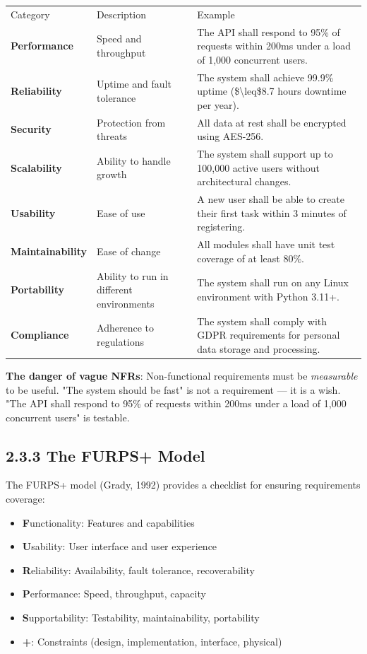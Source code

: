 \documentclass[11pt,a4paper]{book}
\begin{document}
\begin{tabular}{lll}
\hline
Category & Description & Example \\
\textbf{Performance} & Speed and throughput & The API shall respond to 95\% of requests within 200ms under a load of 1,000 concurrent users. \\
\textbf{Reliability} & Uptime and fault tolerance & The system shall achieve 99.9\% uptime (\$\textbackslash{}leq\$8.7 hours downtime per year). \\
\textbf{Security} & Protection from threats & All data at rest shall be encrypted using AES-256. \\
\textbf{Scalability} & Ability to handle growth & The system shall support up to 100,000 active users without architectural changes. \\
\textbf{Usability} & Ease of use & A new user shall be able to create their first task within 3 minutes of registering. \\
\textbf{Maintainability} & Ease of change & All modules shall have unit test coverage of at least 80\%. \\
\textbf{Portability} & Ability to run in different environments & The system shall run on any Linux environment with Python 3.11+. \\
\textbf{Compliance} & Adherence to regulations & The system shall comply with GDPR requirements for personal data storage and processing. \\
\hline
\end{tabular}

\textbf{The danger of vague NFRs}: Non-functional requirements must be \textit{measurable} to be useful. "The system should be fast" is not a requirement --- it is a wish. "The API shall respond to 95\% of requests within 200ms under a load of 1,000 concurrent users" is testable.

\subsection{2.3.3 The FURPS+ Model}

The FURPS+ model (Grady, 1992) provides a checklist for ensuring requirements coverage:

\begin{itemize}
  \item \textbf{F}unctionality: Features and capabilities
  \item \textbf{U}sability: User interface and user experience
  \item \textbf{R}eliability: Availability, fault tolerance, recoverability
  \item \textbf{P}erformance: Speed, throughput, capacity
  \item \textbf{S}upportability: Testability, maintainability, portability
  \item \textbf{+}: Constraints (design, implementation, interface, physical)
\end{itemize}
\end{document}
